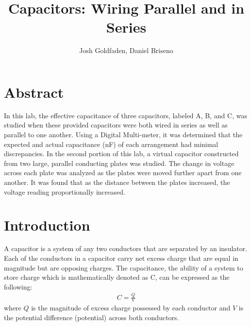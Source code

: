 \documentclass[oneside,12pt]{amsart}
\title{Capacitors: Wiring Parallel and in Series }
\author{Josh Goldfaden, Daniel Briseno}
\date{}
\begin{document}
	\maketitle
	\section{Abstract}
	\indent In this lab, the effective capacitance of three capacitors, labeled A, B, and C, was studied when these provided capacitors were both wired in series as well as parallel to one another. Using a Digital Multi-meter, it was determined that the expected and actual capacitance (nF) of each arrangement had minimal discrepancies. In the second portion of this lab, a virtual capacitor constructed from two large, parallel conducting plates was studied. The change in voltage across each plate was analyzed as the plates were moved further apart from one another. It was found that as the distance between the plates increased, the voltage reading proportionally increased. 
	\section{Introduction}
	\indent A capacitor is a system of any two conductors that are separated by an insulator. Each of the conductors in a capacitor carry net excess charge that are equal in magnitude but are opposing charges. The capacitance, the ability of a system to store charge which is mathematically denoted as C, can be expressed as the following\cite{parallel}: 
	\begin{align*}
		C = \frac{Q}{V}
	\end{align*}
	where $ Q $ is the magnitude of excess charge possessed by each conductor and $V$ is the potential difference (potential) across both conductors.\\
	
\end{document}
